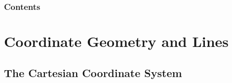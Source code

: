 \documentclass[serif,ignorenonframetext]{beamer}
\title{\commonTitleZeroZeroB}
\subtitle{\commonSubtitleZeroZeroB}
\author{\commonAuthor}
\institute{\commonInstitute}
\date{\commonDateZeroZeroB}
\begin{document}

\begin{frame}
  \titlepage
\end{frame}

\begin{frame}
  \frametitle{Contents}
  \tableofcontents
\end{frame}


\section{Coordinate Geometry and Lines}

\subsection{The Cartesian Coordinate System}
\end{document}
